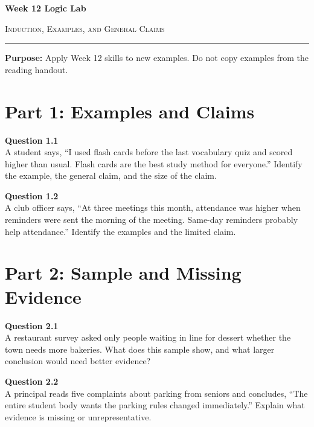 \documentclass[12pt]{article}
\begin{document}
\begin{center}
{\LARGE\bfseries Week 12 Logic Lab}\par\vspace{0.05em}
{\large\scshape Induction, Examples, and General Claims}\par\vspace{0.1em}
\rule{0.78\textwidth}{0.5pt}\par\vspace{0.15em}
\end{center}

\noindent\textbf{Purpose:} Apply Week 12 skills to new examples. Do not copy examples from the reading handout.

\vspace{0.3em}

\section*{Part 1: Examples and Claims}

\textbf{Question 1.1}\\[-0.15em]
A student says, ``I used flash cards before the last vocabulary quiz and scored higher than usual. Flash cards are the best study method for everyone.'' Identify the example, the general claim, and the size of the claim.


\textbf{Question 1.2}\\[-0.15em]
A club officer says, ``At three meetings this month, attendance was higher when reminders were sent the morning of the meeting. Same-day reminders probably help attendance.'' Identify the examples and the limited claim.


\newpage

\section*{Part 2: Sample and Missing Evidence}

\textbf{Question 2.1}\\[-0.15em]
A restaurant survey asked only people waiting in line for dessert whether the town needs more bakeries. What does this sample show, and what larger conclusion would need better evidence?


\textbf{Question 2.2}\\[-0.15em]
A principal reads five complaints about parking from seniors and concludes, ``The entire student body wants the parking rules changed immediately.'' Explain what evidence is missing or unrepresentative.
\end{document}
